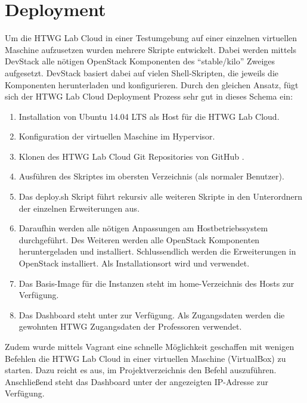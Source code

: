 \chapter{Deployment}

Um die HTWG Lab Cloud in einer Testumgebung auf einer einzelnen virtuellen Maschine aufzusetzen wurden mehrere  Skripte entwickelt.
Dabei werden mittels DevStack \cite{devstack} alle nötigen OpenStack Komponenten des \enquote{stable/kilo} Zweiges aufgesetzt.
DevStack basiert dabei auf vielen Shell-Skripten, die jeweils die Komponenten herunterladen und konfigurieren.
Durch den gleichen Ansatz, fügt sich der HTWG Lab Cloud Deployment Prozess sehr gut in dieses Schema ein:

\begin{enumerate}
\item Installation von Ubuntu 14.04 LTS als Host für die HTWG Lab Cloud.
\item Konfiguration der virtuellen Maschine im Hypervisor.
\item Klonen des HTWG Lab Cloud Git Repositories von GitHub \cite{git-source}.
\item Ausführen des  Skriptes im obersten Verzeichnis (als normaler Benutzer).
\item Das deploy.sh Skript führt rekursiv alle weiteren Skripte in den Unterordnern der einzelnen Erweiterungen aus.
\item Daraufhin werden alle nötigen Anpassungen am Hostbetriebssystem durchgeführt.  Des Weiteren werden alle OpenStack Komponenten heruntergeladen und installiert. Schlussendlich werden die Erweiterungen in OpenStack installiert. Als Installationsort wird  und  verwendet.
\item Das Basis-Image für die Instanzen steht im home-Verzeichnis des Hosts zur Verfügung.
\item Das Dashboard steht unter  zur Verfügung. Als Zugangsdaten werden die gewohnten HTWG Zugangsdaten der Professoren verwendet.
\end{enumerate}

Zudem wurde mittels Vagrant \cite{Vagrant} eine schnelle Möglichkeit geschaffen mit wenigen Befehlen die HTWG Lab Cloud in einer virtuellen Maschine (VirtualBox) zu starten. 
Dazu reicht es aus, im Projektverzeichnis den Befehl  auszuführen.
Anschließend steht das Dashboard unter der angezeigten IP-Adresse zur Verfügung.

